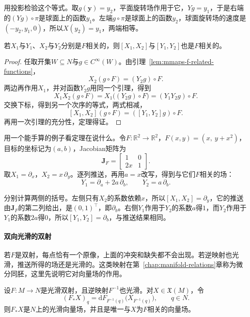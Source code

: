 用投影检验这个等式。取$g(\bm y)=y_2$，平面旋转场作用于它，$Yg=y_1$，于是右端的$(Yg)\circ\pi$是球面上的函数$y_1$。左端$g\circ\pi$是球面上的函数$y_2$，球面旋转场的速度是$(-y_2,y_1,0)$，所以$X(y_2)=y_1$，两端相等。

\begin{theorem}[$F$相关与Lie括号相容]
\label{thm:mmaps-f-related-bracket}
若$X_1$与$Y_1$、$X_2$与$Y_2$分别是$F$相关的，则$[X_1,X_2]$与$[Y_1,Y_2]$也是$F$相关的。
\end{theorem}

\begin{proof}
任取开集$W\subseteq N$与$g\in C^\infty(W)$。由引理~\ref{lem:mmaps-f-related-functions}，
\[
X_2(g\circ F)=(Y_2g)\circ F .
\]
两边再作用$X_1$，并对函数$Y_2g$用同一个引理，得到
\[
X_1X_2(g\circ F)=X_1\bigl((Y_2g)\circ F\bigr)=(Y_1Y_2g)\circ F .
\]
交换下标，得到另一个次序的等式，两式相减，
\[
[X_1,X_2](g\circ F)=([Y_1,Y_2]g)\circ F .
\]
再用一次引理的充分性，定理得证。
\end{proof}

用一个能手算的例子看定理在说什么。令$F:\mathbb R^2\to\mathbb R^2$，$F(x,y)=(x,\ y+x^2)$，目标的坐标记为$(a,b)$，Jacobian矩阵为
\[
\bm J_F=\begin{bmatrix}1&0\\2x&1\end{bmatrix}.
\]
取$X_1=\partial_x$，$X_2=x\,\partial_y$。逐列推送，再用$a=x$改写，得到与它们$F$相关的场：
\[
Y_1=\partial_a+2a\,\partial_b,\qquad Y_2=a\,\partial_b .
\]

分别计算两侧的括号。左侧只有$X_2$的系数依赖$x$，所以$[X_1,X_2]=\partial_y$，它的推送由$\bm J_F$的第二列给出，是$(0,1)^\top$，即$\partial_b$。右侧$Y_1$作用于$Y_2$的系数$a$得$1$，而$Y_2$作用于$Y_1$的系数$2a$得$0$，所以$[Y_1,Y_2]=\partial_b$，与推送结果相同。

\paragraph{双向光滑的双射}
若$F$是双射，每点恰有一个原像，上面的冲突和缺失都不会出现。若逆映射也光滑，推送所得的场还是光滑的。这类映射在第~\ref{chap:manifold-relations}章称为微分同胚，这里先说明它对向量场的作用。

\begin{theorem}[向量场的推送]
\label{thm:mmaps-pushforward-field}
设$F:M\to N$是光滑双射，且逆映射$F^{-1}$也光滑。对$X\in\mathfrak X(M)$，令
\begin{equation}
(F_*X)_q=\mathrm dF_{F^{-1}(q)}\bigl(X_{F^{-1}(q)}\bigr),\qquad q\in N .
\label{eq:mmaps-pushforward-field}
\end{equation}
则$F_*X$是$N$上的光滑向量场，并且是唯一与$X$为$F$相关的向量场。
\end{theorem}

